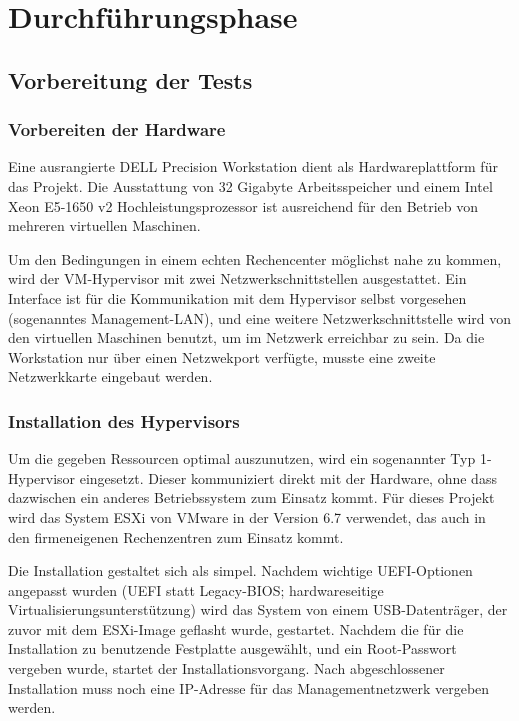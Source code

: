 \section{Durchführungsphase}
\label{sec:Durchführungsphase}

\subsection{Vorbereitung der Tests}
\label{sec:VorbereitungTests}

\subsubsection{Vorbereiten der Hardware}
\label{sec:VorbereitungHardware}
Eine ausrangierte DELL Precision Workstation dient als Hardwareplattform für das Projekt. Die Ausstattung von 32 Gigabyte Arbeitsspeicher und einem Intel Xeon E5-1650 v2 Hochleistungsprozessor ist ausreichend für den Betrieb von mehreren virtuellen Maschinen.

Um den Bedingungen in einem \glqq{}echten\grqq{} Rechencenter möglichst nahe zu kommen, wird der VM-Hypervisor mit zwei Netzwerkschnittstellen ausgestattet. Ein Interface ist für die Kommunikation mit dem Hypervisor selbst vorgesehen (sogenanntes Management-LAN), und eine weitere Netzwerkschnittstelle wird von den virtuellen Maschinen benutzt, um im Netzwerk erreichbar zu sein. Da die Workstation nur über einen Netzwekport verfügte, musste eine zweite Netzwerkkarte eingebaut werden.

\subsubsection{Installation des Hypervisors}
\label{sec:InstallationHypervisor}
Um die gegeben Ressourcen optimal auszunutzen, wird ein sogenannter Typ 1-Hypervisor eingesetzt. Dieser kommuniziert direkt mit der Hardware, ohne dass dazwischen ein anderes Betriebssystem zum Einsatz kommt. Für dieses Projekt wird das System \glqq{}ESXi\grqq{} von VMware in der Version 6.7 verwendet, das auch in den firmeneigenen Rechenzentren zum Einsatz kommt.

Die Installation gestaltet sich als simpel. Nachdem wichtige UEFI-Optionen angepasst wurden (UEFI statt Legacy-BIOS; hardwareseitige Virtualisierungsunterstützung) wird das System von einem USB-Datenträger, der zuvor mit dem ESXi-Image geflasht wurde, gestartet. Nachdem die für die Installation zu benutzende Festplatte ausgewählt, und ein Root-Passwort vergeben wurde, startet der Installationsvorgang. Nach abgeschlossener Installation muss noch eine IP-Adresse für das Managementnetzwerk vergeben werden.

